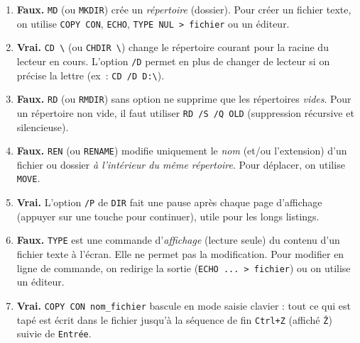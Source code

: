 \documentclass[11pt]{article}
\begin{document}
\begin{corrige}
\begin{enumerate}
    \item \textbf{Faux.} \texttt{MD} (ou \texttt{MKDIR}) crée un \emph{répertoire} (dossier). Pour créer un fichier texte, on utilise \texttt{COPY CON}, \texttt{ECHO}, \texttt{TYPE NUL \textgreater{} fichier} ou un éditeur.
    \item \textbf{Vrai.} \texttt{CD \textbackslash} (ou \texttt{CHDIR \textbackslash}) change le répertoire courant pour la racine du lecteur en cours. L'option \texttt{/D} permet en plus de changer de lecteur si on précise la lettre (ex~: \texttt{CD /D D:\textbackslash}).
    \item \textbf{Faux.} \texttt{RD} (ou \texttt{RMDIR}) sans option ne supprime que les répertoires \emph{vides}. Pour un répertoire non vide, il faut utiliser \texttt{RD /S /Q OLD} (suppression récursive et silencieuse).
    \item \textbf{Faux.} \texttt{REN} (ou \texttt{RENAME}) modifie uniquement le \emph{nom} (et/ou l'extension) d'un fichier ou dossier \emph{à l'intérieur du même répertoire}. Pour déplacer, on utilise \texttt{MOVE}.
    \item \textbf{Vrai.} L'option \texttt{/P} de \texttt{DIR} fait une pause après chaque page d'affichage (appuyer sur une touche pour continuer), utile pour les longs listings.
    \item \textbf{Faux.} \texttt{TYPE} est une commande d'\emph{affichage} (lecture seule) du contenu d'un fichier texte à l'écran. Elle ne permet pas la modification. Pour modifier en ligne de commande, on redirige la sortie (\texttt{ECHO ... \textgreater{} fichier}) ou on utilise un éditeur.
    \item \textbf{Vrai.} \texttt{COPY CON nom\_fichier} bascule en mode saisie clavier : tout ce qui est tapé est écrit dans le fichier jusqu'à la séquence de fin \texttt{Ctrl+Z} (affiché \texttt{\^Z}) suivie de \texttt{Entrée}.
\end{enumerate}
\end{corrige}
\end{document}
